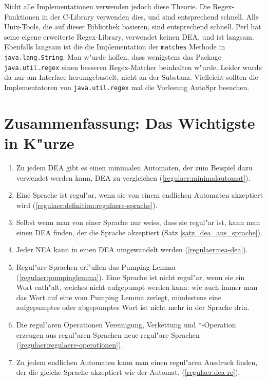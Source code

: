 \begin{sloppypar} %
Nicht alle Implementationen verwenden jedoch diese Theorie. Die
Regex-Funktionen in der C-Library verwenden dies, und sind entsprechend
schnell. Alle Unix-Tools, die auf dieser Bibliothek basieren, sind
entsprechend schnell. Perl hat seine eigene erweiterte Regex-Library,
verwendet keinen DEA, und ist langsam. Ebenfalls langsam ist die
die Implementation der {\tt matches} Methode in {\tt java.lang.String}.
Man w"urde hoffen, dass wenigstens das Package {\tt java.util.regex} einen
besseren Regex-Matcher beinhalten w"urde. Leider wurde da nur am
Interface herumgebastelt, nicht an der Substanz. Vielleicht sollten
die Implementatoren von {\tt java.util.regex} mal die Vorlesung AutoSpr
besuchen.
\end{sloppypar}

\section{Zusammenfassung: Das Wichtigste in K"urze}
\begin{enumerate}
\item Zu jedem DEA gibt es einen
minimalen Automaten, der zum Beispiel dazu verwendet werden kann,
DEA zu vergleichen
(\ref{regulaer:minimalautomat}).
\item Eine Sprache ist regul"ar, wenn sie von einem endlichen Automaten
akzeptiert wird (\ref{regulaer:definition:regulaere-sprache}).
\item Selbst wenn man von einer Sprache nur weiss, dass sie regul"ar
ist, kann man einen DEA finden, der die Sprache akzeptiert
(Satz \ref{satz_dea_aus_sprache}).
\item Jeder NEA kann in einen DEA umgewandelt werden (\ref{regulaer:nea-dea}).
\item Regul"are Sprachen erf"ullen das Pumping Lemma
(\ref{regulaer:pumpinglemma}).
Eine Sprache ist nicht regul"ar, wenn sie ein Wort enth"alt, welches
nicht aufgepumpt werden kann: wie auch immer man das Wort
auf eine vom Pumping Lemma zerlegt, mindestens eine aufgepumptes
oder abgepumptes Wort ist nicht mehr in der Sprache drin.
\item Die regul"aren Operationen Vereinigung, Verkettung und $*$-Operation
erzeugen aus regul"aren Sprachen neue regul"are Sprachen
(\ref{regulaer:regulaere-operationen}).
\item Zu jedem endlichen Automaten kann man einen regul"aren Ausdruck
finden, der die gleiche Sprache akzeptiert wie der Automat.
(\ref{regulaer:dea-re}).
\end{enumerate}
